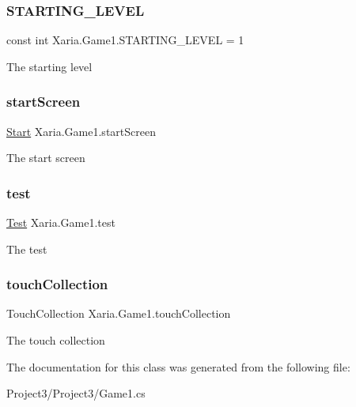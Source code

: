 \subsubsection{\texorpdfstring{S\+T\+A\+R\+T\+I\+N\+G\+\_\+\+L\+E\+V\+EL}{STARTING\_LEVEL}}
{\footnotesize\ttfamily const int Xaria.\+Game1.\+S\+T\+A\+R\+T\+I\+N\+G\+\_\+\+L\+E\+V\+EL = 1}



The starting level 

\mbox{\label{classXaria_1_1Game1_a6707e2f65e76cd15207852d0f502f07c}} 
\subsubsection{\texorpdfstring{start\+Screen}{startScreen}}
{\footnotesize\ttfamily \hyperlink{classXaria_1_1Screens_1_1Start}{Start} Xaria.\+Game1.\+start\+Screen\hspace{0.3cm}{\ttfamily [private]}}



The start screen 

\mbox{\label{classXaria_1_1Game1_af5b61c7ae01c473704d377da028b39eb}} 
\subsubsection{\texorpdfstring{test}{test}}
{\footnotesize\ttfamily \hyperlink{classXaria_1_1Test}{Test} Xaria.\+Game1.\+test\hspace{0.3cm}{\ttfamily [private]}}



The test 

\mbox{\label{classXaria_1_1Game1_a77bc7b728632132aa5b8c6b21a7d693f}} 
\subsubsection{\texorpdfstring{touch\+Collection}{touchCollection}}
{\footnotesize\ttfamily Touch\+Collection Xaria.\+Game1.\+touch\+Collection\hspace{0.3cm}{\ttfamily [private]}}



The touch collection 



The documentation for this class was generated from the following file\+:\begin{DoxyCompactItemize}
\item 
Project3/\+Project3/Game1.\+cs\end{DoxyCompactItemize}
